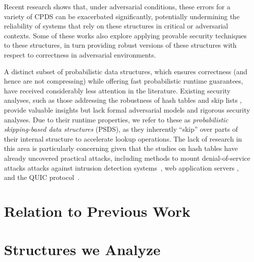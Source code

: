 Recent research \cite{naor2015bloom, clayton2019, FPUV22, PatersonR22, markelon23, cryptoeprint:2024/1312, filic2025deletions} shows that, under adversarial conditions, these errors for a variety of CPDS can be exacerbated significantly, potentially undermining the reliability of systems that rely on these structures in critical or adversarial contexts. Some of these works also explore applying provable security techniques to these structures, in turn providing robust versions of these structures with respect to correctness in adversarial environments. 

A distinct subset of probabilistic data structures, which ensures correctness (and hence are not compressing) while offering fast probabilistic runtime guarantees, have received considerably less attention in the literature. Existing security analyses, such as those addressing the robustness of hash tables \cite{CrosbyW03, aumasson2012hash, bar2007remote, eckhoff2009hash,klink2011efficient,bottinelli2025hash} and skip lists \cite{nussbaum2019skiplist}, provide valuable insights but lack formal adversarial models and rigorous security analyses. Due to their runtime properties, we refer to these as \emph {probabilistic skipping-based data structures} (PSDS), as they inherently ``skip'' over parts of their internal structure to accelerate lookup operations.
The lack of research in this area is particularly concerning given that the studies on hash tables have already uncovered practical attacks, including methods to mount denial-of-service attacks attacks against intrusion detection systems~\cite{bar2007remote}, web application servers \cite{klink2011efficient}, and the QUIC protocol~\cite{bottinelli2025hash}.


\section{Relation to Previous Work}


\section{Structures we Analyze}



